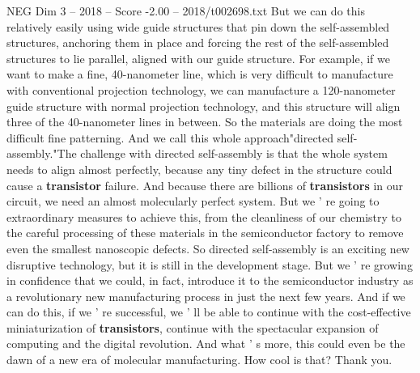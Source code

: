 \begin{textsample}{NEG Dim 3 – 2018 – Score -2.00 – 2018/t002698.txt}
But we can do this relatively easily using wide guide structures that pin down the self-assembled structures, anchoring them in place and forcing the rest of the self-assembled structures to lie parallel, aligned with our guide structure.
For example, if we want to make a fine, 40-nanometer line, which is very difficult to manufacture with conventional projection technology, we can manufacture a 120-nanometer guide structure with normal projection technology, and this structure will align three of the 40-nanometer lines in between.
So the materials are doing the most difficult fine patterning.
And we call this whole approach"directed self-assembly."The challenge with directed self-assembly is that the whole system needs to align almost perfectly, because any tiny defect in the structure could cause a \textbf{transistor} failure.
And because there are billions of \textbf{transistors} in our circuit, we need an almost molecularly perfect system.
But we ' re going to extraordinary measures to achieve this, from the cleanliness of our chemistry to the careful processing of these materials in the semiconductor factory to remove even the smallest nanoscopic defects.
So directed self-assembly is an exciting new disruptive technology, but it is still in the development stage.
But we ' re growing in confidence that we could, in fact, introduce it to the semiconductor industry as a revolutionary new manufacturing process in just the next few years.
And if we can do this, if we ' re successful, we ' ll be able to continue with the cost-effective miniaturization of \textbf{transistors}, continue with the spectacular expansion of computing and the digital revolution.
And what ' s more, this could even be the dawn of a new era of molecular manufacturing.
How cool is that?
Thank you.

\end{textsample}

